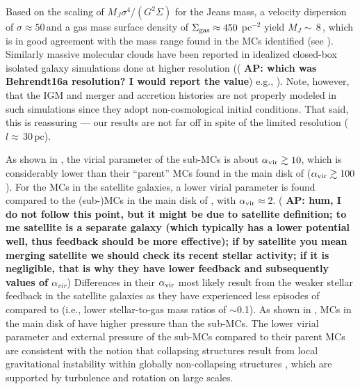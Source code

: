 \IfFileExists{emulateapjlegacy.cls}{\documentclass[iop]{emulateapjlegacy}}{\documentclass[iop]{emulateapj}}
\newcommand{\AP}[1]{({\bf \color{apcolor} AP: #1})}
\newcommand{\DL}[1]{({\bf \color{dlcolor} DL: #1})}
\begin{document}
Based on the scaling of $M_J$\eq$\sigma^4/(G^2\Sigma)$ for the Jeans mass, a velocity dispersion of $\sigma\approx50$\,\kms and a gas mass surface density of $\Sigma_{\rm gas}\approx450$\,\Msun\,pc$^{-2}$ yield $M_J\sim$\,8\,\Msun, which is in good agreement with the mass range found in the MCs identified (see ).
%
Similarly massive molecular clouds have been reported in idealized closed-box isolated galaxy simulations done at higher resolution (\AP{which was Behrendt16a resolution? I would report the value} e.g., \citealt{Behrendt16a}). Note, however, that the IGM and merger and accretion histories are not properly modeled in such simulations since they adopt non-cosmological initial conditions. That said, this is reassuring --- our results are not far off in spite of the limited resolution ($l\approx$\,30\,pc).


As shown in , the virial parameter of the sub-MCs is about $\alpha_{\rm vir}\gtrsim10$, which is considerably lower than their ``parent'' MCs found in the main disk of \flower ($\alpha_{\rm vir}\gtrsim100$).
%
For the MCs in the satellite galaxies, a lower virial parameter is found compared to the (sub-)MCs in the main disk of \flower, with $\alpha_{\rm vir}\approx$\,2.
\AP{hum, I do not follow this point, but it might be due to satellite definition; to me satellite is a separate galaxy (which typically has a lower potential well, thus feedback should be more effective); if by satellite you mean merging satellite we should check its recent stellar activity; if it is negligible, that is why they have lower feedback and subsequently values of $\alpha_{vir}$} Differences in their $\alpha_{\rm vir}$ most likely result from the weaker stellar feedback in the satellite galaxies as they have experienced less episodes of \SF compared to \flower (i.e., lower stellar-to-gas mass ratios of $\sim$0.1).
As shown in , MCs in the main disk of \flower have higher pressure than the sub-MCs. The lower virial parameter and external pressure of the sub-MCs compared to their parent MCs are consistent with the notion that collapsing structures result from local gravitational instability within globally non-collapsing structures \citep[see e.g.,][]{Ballesteros-Paredes11a}, which are supported by turbulence and rotation on large scales.
\end{document}

